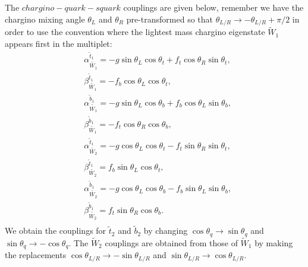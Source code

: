 \documentclass[final,3p,times,pdflatex]{elsarticle}
\begin{document}
The $chargino - quark - squark$ couplings are given below, remember we have the chargino mixing angle $\theta_L$ and $\theta_R$ pre-transformed so that $\theta_{L/R} \rightarrow -\theta_{L/R} + \pi/2$ in order to use the convention where the lightest mass chargino eigenstate $\tilde{W}_1$ appears first in the multiplet:
\begin{equation}
\begin{aligned}
& \alpha_{\tilde{W_1}}^{\tilde{t}_1} = -g \sin\theta_L\cos\theta_t + f_t \cos\theta_R\sin\theta_t, \\ & \beta_{\tilde{W_1}}^{\tilde{t}_1} = - f_b \cos\theta_L\cos\theta_t, \\ & \alpha_{\tilde{W_1}}^{\tilde{b}_1} = -g \sin\theta_L\cos\theta_b + f_b \cos\theta_L\sin\theta_b, \\ & \beta_{\tilde{W_1}}^{\tilde{b}_1} = - f_t \cos\theta_R\cos\theta_b, \\ & \alpha_{\tilde{W_2}}^{\tilde{t}_1} = -g \cos\theta_L\cos\theta_t - f_t \sin\theta_R\sin\theta_t, \\ & \beta_{\tilde{W_2}}^{\tilde{t}_1} =  f_b \sin\theta_L\cos\theta_t, \\ & \alpha_{\tilde{W_2}}^{\tilde{b}_1} = -g \cos\theta_L\cos\theta_b - f_b \sin\theta_L\sin\theta_b, \\ & \beta_{\tilde{W_2}}^{\tilde{b}_1} =  f_t \sin\theta_R\cos\theta_b. \\
\end{aligned}
\end{equation}
We obtain the couplings for $\tilde{t}_2$ and $\tilde{b}_2$ by changing $\cos\theta_{q} \rightarrow \sin\theta_q$ and $\sin\theta_q \rightarrow -\cos\theta_q$. The $\tilde{W}_2$ couplings are obtained from those of $\tilde{W}_1$ by making the replacements $\cos\theta_{L/R} \rightarrow -\sin\theta_{L/R}$ and $\sin\theta_{L/R} \rightarrow \cos\theta_{L/R}$.
\end{document}
